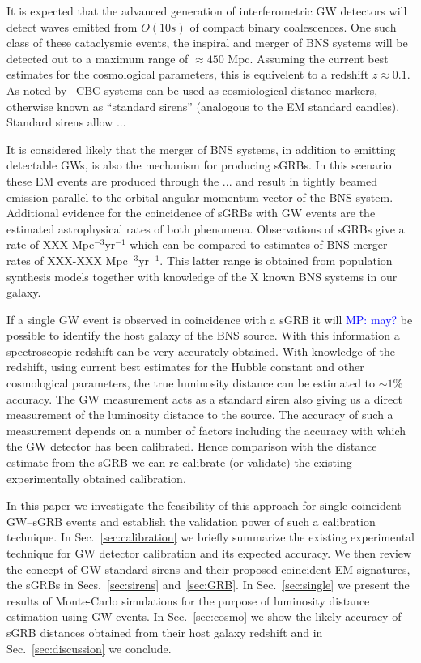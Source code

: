 \documentclass[12pt]{iopart}
\newcommand{\MP}[1]{\textcolor{blue}{MP: #1}}
\begin{document}
It is expected that the advanced generation of interferometric \ac{GW}
detectors will detect waves emitted from $O(10s)$ of compact binary
coalescences.  One such class of these cataclysmic events, the inspiral and
merger of \ac{BNS} systems will be detected out to a maximum range of $\approx
450$ Mpc. Assuming the current best estimates for the cosmological parameters,
this is equivelent to a redshift $z\approx 0.1$. As noted by~\cite{} \ac{CBC}
systems can be used as cosmiological distance markers, otherwise known as
``standard sirens'' (analogous to the \ac{EM} standard candles). Standard sirens
allow ...

It is considered likely that the merger of \ac{BNS} systems, in addition to
emitting detectable \acp{GW}, is also the mechanism for producing \acp{sGRB}.
In this scenario these \ac{EM} events are produced through the ... and result
in tightly beamed emission parallel to the orbital angular momentum vector of
the \ac{BNS} system. Additional evidence for the coincidence of \acp{sGRB} with
\ac{GW} events are the estimated astrophysical rates of both phenomena.
Observations of \acp{sGRB} give a rate of XXX Mpc$^{-3}$yr$^{-1}$ which can be
compared to estimates of \ac{BNS} merger rates of XXX-XXX Mpc$^{-3}$yr$^{-1}$.
This latter range is obtained from population synthesis models together with
knowledge of the X known \ac{BNS} systems in our galaxy. 
  
If a single \ac{GW} event is observed in coincidence with a \ac{sGRB} it will \MP{may?}
be possible to identify the host galaxy of the \ac{BNS} source.  With this
information a spectroscopic redshift can be very accurately obtained. With
knowledge of the redshift, using current best estimates for the Hubble constant
and other cosmological parameters, the true luminosity distance can be
estimated to $\sim 1\%$ accuracy.  The \ac{GW} measurement acts as a standard
siren also giving us a direct measurement of the luminosity distance to the source.
The accuracy of such a measurement depends on a number of factors including the
accuracy with which the \ac{GW} detector has been calibrated.  Hence comparison
with the distance estimate from the \ac{sGRB} we can re-calibrate (or validate)
the existing experimentally obtained calibration. 

In this paper we investigate the feasibility of this approach for single
coincident \ac{GW}--\ac{sGRB} events and establish the validation power of such
a calibration technique.  In Sec.~\ref{sec:calibration} we briefly summarize
the existing experimental technique for \ac{GW} detector calibration and its
expected accuracy.  We then review the concept of \ac{GW} standard sirens and
their proposed coincident \ac{EM} signatures, the \acp{sGRB} in
Secs.~\ref{sec:sirens} and~\ref{sec:GRB}. In Sec.~\ref{sec:single} we present
the results of Monte-Carlo simulations for the purpose of luminosity distance
estimation using \ac{GW} events. In Sec.~\ref{sec:cosmo} we show the likely
accuracy of \ac{sGRB} distances obtained from their host galaxy redshift and in
Sec.~\ref{sec:discussion} we conclude.    
\end{document}
